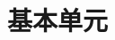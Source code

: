 \documentclass{xNoteBook}
\begin{document}

\maketitle

\frontmatter
\makesymb

\tableofcontents
\listoffigures
\listoftables

\mainmatter

\nocite{*}

\part{基本单元}





\appendix

\backmatter



\end{document}
